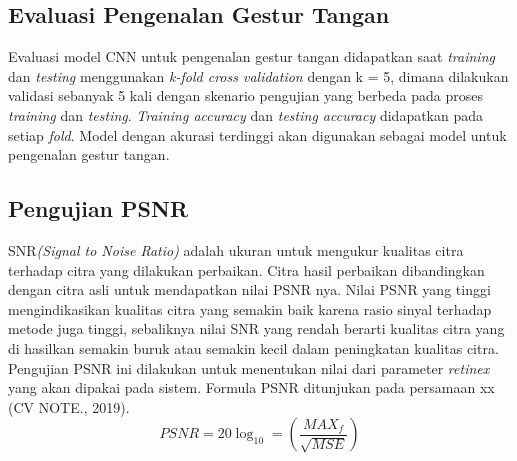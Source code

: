 \subsection{Evaluasi Pengenalan Gestur Tangan}
Evaluasi model CNN untuk pengenalan gestur tangan didapatkan saat \emph{training} dan \emph{testing} menggunakan \emph{k-fold cross validation} dengan k = 5, dimana dilakukan validasi sebanyak 5 kali dengan skenario pengujian yang berbeda pada proses \emph{training} dan \emph{testing}.
\emph{Training accuracy} dan \emph{testing accuracy} didapatkan pada setiap \emph{fold}. Model dengan akurasi terdinggi akan digunakan sebagai model untuk pengenalan gestur tangan.
\subsection{Pengujian PSNR}
SNR\emph{(Signal to Noise Ratio)} adalah ukuran untuk mengukur kualitas citra terhadap citra yang dilakukan perbaikan. Citra hasil perbaikan dibandingkan dengan citra asli untuk mendapatkan nilai PSNR nya. Nilai PSNR yang tinggi mengindikasikan kualitas citra yang semakin baik karena rasio sinyal terhadap metode juga tinggi, sebaliknya nilai SNR yang rendah berarti kualitas citra yang di hasilkan semakin buruk atau semakin kecil dalam peningkatan kualitas citra. Pengujian PSNR ini dilakukan untuk menentukan nilai dari parameter \emph{retinex} yang akan dipakai pada sistem. Formula PSNR ditunjukan pada persamaan xx (CV NOTE., 2019).
\begin{equation}
	PSNR=20\log_{10}=\left(\frac{MAX_f}{\sqrt{MSE}}\right)
\end{equation}
